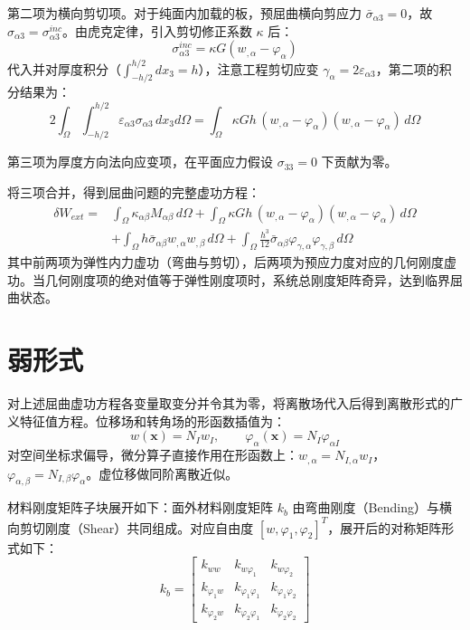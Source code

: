 第二项为横向剪切项。对于纯面内加载的板，预屈曲横向剪应力 $\bar{\sigma}_{\alpha 3} = 0$，故 $\sigma_{\alpha 3} = \sigma_{\alpha 3}^{inc}$。由虎克定律，引入剪切修正系数 $\kappa$ 后：
\begin{equation}
\sigma_{\alpha 3}^{inc} = \kappa G(w_{,\alpha} - \varphi_\alpha)
\end{equation}
代入并对厚度积分（$\int_{-h/2}^{h/2} dx_3 = h$），注意工程剪切应变 $\gamma_\alpha = 2\varepsilon_{\alpha 3}$，第二项的积分结果为：
\begin{equation}
2\int_\Omega\int_{-h/2}^{h/2} \varepsilon_{\alpha 3}\sigma_{\alpha 3}\, dx_3 d\Omega = \int_\Omega \kappa G h\,(w_{,\alpha} - \varphi_\alpha)(w_{,\alpha} - \varphi_\alpha)\, d\Omega
\end{equation}

第三项为厚度方向法向应变项，在平面应力假设 $\sigma_{33}=0$ 下贡献为零。

将三项合并，得到屈曲问题的完整虚功方程：
\begin{equation}
\begin{aligned}
\delta W_{ext} =& \int_\Omega \kappa_{\alpha\beta}M_{\alpha\beta}\, d\Omega + \int_\Omega \kappa G h\,(w_{,\alpha} - \varphi_\alpha)(w_{,\alpha} - \varphi_\alpha)\, d\Omega \\
&+ \int_\Omega h\bar{\sigma}_{\alpha\beta} w_{,\alpha}w_{,\beta}\, d\Omega + \int_\Omega \frac{h^3}{12}\bar{\sigma}_{\alpha\beta} \varphi_{\gamma,\alpha}\varphi_{\gamma,\beta}\, d\Omega
\end{aligned}
\end{equation}
其中前两项为弹性内力虚功（弯曲与剪切），后两项为预应力度对应的几何刚度虚功。当几何刚度项的绝对值等于弹性刚度项时，系统总刚度矩阵奇异，达到临界屈曲状态。

\section{弱形式}

对上述屈曲虚功方程各变量取变分并令其为零，将离散场代入后得到离散形式的广义特征值方程。位移场和转角场的形函数插值为：
\begin{equation}
w(\mathbf{x}) = N_I w_I, \qquad \varphi_\alpha(\mathbf{x}) = N_I \varphi_{\alpha I}
\end{equation}
对空间坐标求偏导，微分算子直接作用在形函数上：$w_{,\alpha} = N_{I,\alpha}w_I$，$\varphi_{\alpha,\beta} = N_{I,\beta}\varphi_\alpha$。虚位移做同阶离散近似。

材料刚度矩阵子块展开如下：面外材料刚度矩阵 $k_b$ 由弯曲刚度（Bending）与横向剪切刚度（Shear）共同组成。对应自由度 $[w,\varphi_1,\varphi_2]^T$，展开后的对称矩阵形式如下：
\begin{equation}
k_b = \begin{bmatrix}
k_{ww} & k_{w\varphi_1} & k_{w\varphi_2} \\
k_{\varphi_1 w} & k_{\varphi_1\varphi_1} & k_{\varphi_1\varphi_2} \\
k_{\varphi_2 w} & k_{\varphi_2\varphi_1} & k_{\varphi_2\varphi_2}
\end{bmatrix}
\end{equation}

